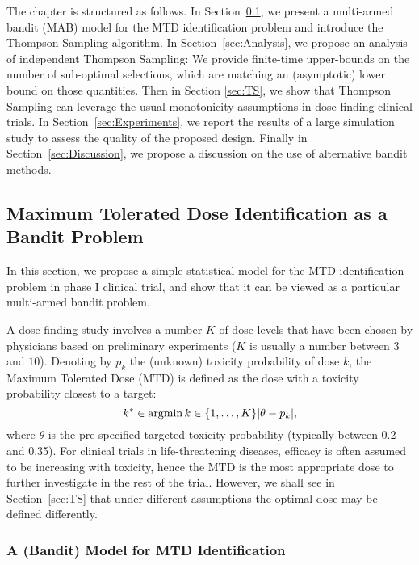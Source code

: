 The chapter is structured as follows. In Section~\ref{sec:Bandits}, we present a multi-armed bandit (MAB) model for the MTD identification problem and introduce the Thompson Sampling algorithm. In Section~\ref{sec:Analysis}, we propose an analysis of independent Thompson Sampling: We provide finite-time upper-bounds on the number of sub-optimal selections, which are matching an (asymptotic) lower bound on those quantities. Then in Section \ref{sec:TS}, we show that Thompson Sampling can leverage the usual monotonicity assumptions in dose-finding clinical trials. %
In Section~\ref{sec:Experiments}, we report the results of a large simulation study to assess the quality of the proposed design. Finally in Section~\ref{sec:Discussion}, we propose a discussion on the use of alternative bandit methods. %
                  
\subsection{Maximum Tolerated Dose Identification as a Bandit Problem}\label{sec:Bandits}

In this section, we propose a simple statistical model for the MTD identification problem in phase I clinical trial, and show that it can be viewed as a particular multi-armed bandit problem.

A dose finding study involves a number $K$ of dose levels that have been chosen by physicians based on preliminary experiments ($K$ is usually a number between $3$ and $10$). Denoting by $p_k$ the (unknown) toxicity probability of dose $k$, the Maximum Tolerated Dose (MTD) is defined as the dose with a toxicity probability closest to a target:
\[k^* \in \operatorname*{argmin}{k \in \{1,\dots,K\}} |\theta - p_k|,\]
where $\theta$ is the pre-specified targeted toxicity probability (typically between 0.2 and 0.35). For clinical trials in life-threatening diseases, efficacy is often assumed to be increasing with toxicity, hence the MTD is the most appropriate dose to further investigate in the rest of the trial. However, we shall see in Section~\ref{sec:TS} that under different assumptions the optimal dose may be defined differently. 

\subsubsection{A (Bandit) Model for MTD Identification}

